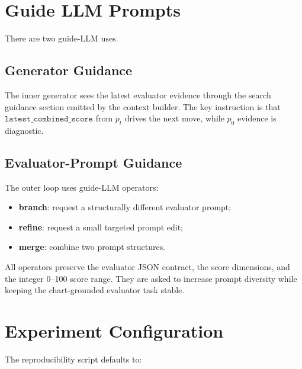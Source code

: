 \documentclass[11pt]{article}
\begin{document}
\section{Guide LLM Prompts}

There are two guide-LLM uses.

\subsection{Generator Guidance}

The inner generator sees the latest evaluator evidence through the search
guidance section emitted by the context builder. The key instruction is that
\(\texttt{latest\_combined\_score}\) from \(p_t\) drives the next move, while
\(p_0\) evidence is diagnostic.

\subsection{Evaluator-Prompt Guidance}

The outer loop uses guide-LLM operators:

\begin{itemize}
  \item \textbf{branch}: request a structurally different evaluator prompt;
  \item \textbf{refine}: request a small targeted prompt edit;
  \item \textbf{merge}: combine two prompt structures.
\end{itemize}

All operators preserve the evaluator JSON contract, the score dimensions, and
the integer 0--100 score range. They are asked to increase prompt diversity while
keeping the chart-grounded evaluator task stable.

\section{Experiment Configuration}

The reproducibility script defaults to:
\end{document}
